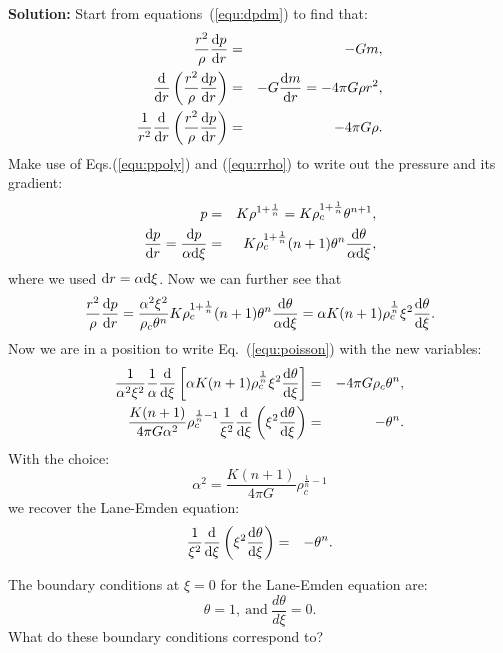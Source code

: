 \documentclass[12pt]{article}
\def\dd{{\rm d}}
\begin{document}
{\bf Solution:} Start from equations~(\ref{equ:dpdm}) to find that:
\begin{eqnarray}
\frac{r^2}{\rho} \frac{\dd p}{\dd r} &=& -Gm, \\
\frac{\dd}{\dd r} \left( \frac{r^2}{\rho} \frac{\dd p}{\dd r} \right) &=& -G \frac{\dd m}{\dd r} = -4\pi G \rho r^2, \\
\frac{1}{r^2 }\frac{\dd}{\dd r} \left( \frac{r^2}{\rho} \frac{\dd p}{\dd r} \right) &=& -4\pi G \rho.\label{equ:poisson}
\end{eqnarray}
Make use of Eqs.(\ref{equ:ppoly}) and (\ref{equ:rrho}) to write out
the pressure and its gradient:
\begin{eqnarray}
p &=& K \rho^{1+\frac{1}{n}} = K \rho_c^{1+\frac{1}{n}}\theta^{n+1}, \\
\frac{\dd p}{\dd r} = \frac{\dd p}{\alpha \dd\xi} &=& K \rho_c^{1+\frac{1}{n}} (n+1) \theta^n \frac{\dd\theta}{\alpha\dd\xi},
\end{eqnarray}
where we used $\dd r = \alpha\dd\xi$. Now we can further see that
\begin{eqnarray}
\frac{r^2}{\rho} \frac{\dd p}{\dd r} = \frac{\alpha^2 \xi^2}{\rho_c \theta^n} K \rho_c^{1+\frac{1}{n}} (n+1) \theta^n \frac{\dd\theta}{\alpha\dd\xi} = \alpha K (n+1) \rho_c^{\frac{1}{n}}\xi^2 \frac{\dd\theta}{\dd\xi}.
\end{eqnarray}
Now we are in a position to write Eq.~(\ref{equ:poisson}) with the new
variables:
\begin{eqnarray}
  \frac{1}{\alpha^2 \xi^2} \frac{1}{\alpha} \frac{\dd}{\dd\xi} \left[ \alpha K(n+1)\rho_c^{\frac{1}{n}} \xi^2 \frac{\dd\theta}{\dd\xi} \right] &=& - 4\pi G \rho_c \theta^n,\\
  \frac{K(n+1)}{4\pi G \alpha ^2} \rho_c^{\frac{1}{n}-1} \frac{1}{\xi^2} \frac{\dd}{\dd\xi}\left(\xi^2 \frac{\dd\theta}{\dd\xi} \right) &=& -\theta^n.
\end{eqnarray}
With the choice:
\begin{equation}
\alpha^2 = \frac{K(n+1)}{4\pi G} \rho_c^{\frac{1}{n}-1}
\end{equation}
we recover the Lane-Emden equation:
\begin{eqnarray}
 \frac{1}{\xi^2} \frac{\dd}{\dd\xi}\left(\xi^2 \frac{\dd\theta}{\dd\xi} \right) &=& -\theta^n.
\end{eqnarray}



The boundary conditions at $\xi=0$ for the Lane-Emden equation are:
\begin{equation}
\theta = 1,\ \mbox{and}\ \frac{d\theta}{d\xi} = 0.
\end{equation}
What do these boundary conditions correspond to?
\end{document}
